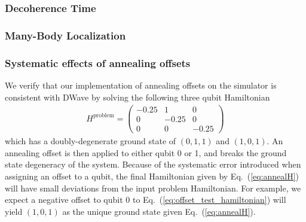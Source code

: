 \documentclass[prd,twocolumn,tightenlines,preprintnumbers,showpacs,superscriptaddress,notitlepage,nofootinbib,eqsecnum,floatfix,longbibliography,aps,10pt]{revtex4-2}
\begin{document}
\subsubsection{Decoherence Time}
\label{sec:methods:deco}



\subsubsection{Many-Body Localization}
\label{sec:methods:mbl}



\subsubsection{Systematic effects of annealing offsets}
\label{sec:app:offset}

We verify that our implementation of annealing offsets on the simulator is consistent with DWave by solving the following three qubit Hamiltonian
\begin{align}
	\label{eq:offset_test_hamiltonian}
	H^{\textrm{problem}} =
	\begin{pmatrix}
		-0.25 & 1 & 0 \\
		0 & -0.25 & 0 \\
		0 & 0 & -0.25
	\end{pmatrix}
\end{align}
which has a doubly-degenerate ground state of $(0, 1, 1)$ and $(1, 0, 1)$. An annealing offset is then applied to either qubit 0 or 1, and breaks the ground state degeneracy of the system. Because of the systematic error introduced when assigning an offset to a qubit, the final Hamiltonian given by Eq.~(\ref{eq:annealH}) will have small deviations from the input problem Hamiltonian. For example, we expect a negative offset to qubit 0 to Eq.~(\ref{eq:offset_test_hamiltonian}) will yield $(1, 0, 1)$ as the unique ground state given Eq.~(\ref{eq:annealH}).
\end{document}
